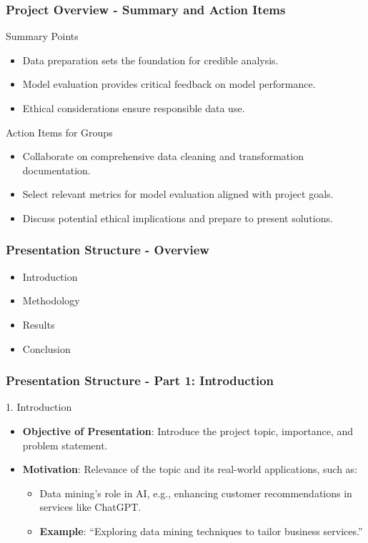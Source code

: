 \documentclass[aspectratio=169]{beamer}
\begin{document}
\begin{frame}[fragile]
    \frametitle{Project Overview - Summary and Action Items}
    \begin{block}{Summary Points}
        \begin{itemize}
            \item Data preparation sets the foundation for credible analysis.
            \item Model evaluation provides critical feedback on model performance.
            \item Ethical considerations ensure responsible data use.
        \end{itemize}
    \end{block}

    \begin{block}{Action Items for Groups}
        \begin{itemize}
            \item Collaborate on comprehensive data cleaning and transformation documentation.
            \item Select relevant metrics for model evaluation aligned with project goals.
            \item Discuss potential ethical implications and prepare to present solutions.
        \end{itemize}
    \end{block}
\end{frame}

\begin{frame}[fragile]
    \frametitle{Presentation Structure - Overview}
    \begin{itemize}
        \item Introduction
        \item Methodology
        \item Results
        \item Conclusion
    \end{itemize}
\end{frame}

\begin{frame}[fragile]
    \frametitle{Presentation Structure - Part 1: Introduction}
    \begin{block}{1. Introduction}
        \begin{itemize}
            \item \textbf{Objective of Presentation}: Introduce the project topic, importance, and problem statement.
            \item \textbf{Motivation}: Relevance of the topic and its real-world applications, such as:
            \begin{itemize}
                \item Data mining's role in AI, e.g., enhancing customer recommendations in services like ChatGPT.
                \item \textbf{Example}: “Exploring data mining techniques to tailor business services.”
            \end{itemize}
        \end{itemize}
    \end{block}
\end{frame}
\end{document}
